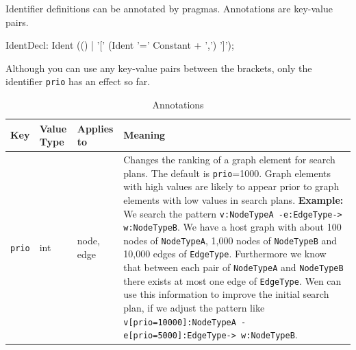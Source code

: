 Identifier definitions can be annotated by pragmas. Annotations are key-value pairs.
\begin{rail}
  IdentDecl: Ident (() | '[' (Ident '=' Constant + ',') ']');
\end{rail}
Although you can use any key-value pairs between the brackets, only the identifier \texttt{prio} has an effect so far.
\begin{table}[htbp]
\begin{tabularx}{\linewidth}{|lllX|} \hline
  \textbf{Key} & \textbf{Value Type} & \textbf{Applies to} & \textbf{Meaning} \\ \hline
  \texttt{prio} & int & node, edge & Changes the ranking of a graph element for search plans. The default is \texttt{prio}=1000. Graph elements with high values are likely to appear prior to graph elements with low values in search plans. {\small \textbf{Example:} We search the pattern \texttt{v:NodeTypeA -e:EdgeType-> w:NodeTypeB}. We have a host graph with about 100 nodes of \texttt{NodeTypeA}, 1,000 nodes of \texttt{NodeTypeB} and 10,000 edges of \texttt{EdgeType}. Furthermore we know that between each pair of \texttt{NodeTypeA} and \texttt{NodeTypeB} there exists at most one edge of \texttt{EdgeType}. Wen can use this information to improve the initial search plan, if we adjust the pattern like \texttt{v[prio=10000]:NodeTypeA -e[prio=5000]:EdgeType-> w:NodeTypeB}}. \\ \hline
\end{tabularx}
\caption{Annotations}
\label{tabannotations}
\end{table}


